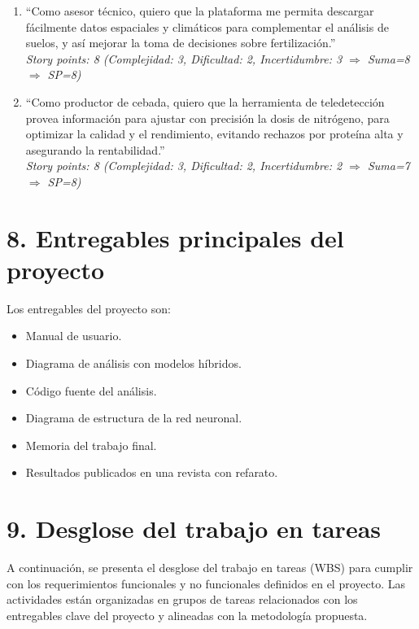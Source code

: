 \documentclass[
11pt, %
]{charter}
\begin{document}
\begin{enumerate}
    \item “Como asesor técnico, quiero que la plataforma me permita descargar fácilmente datos espaciales y climáticos para complementar el análisis de suelos, y así mejorar la toma de decisiones sobre fertilización.”\\ 
    \textit{Story points: 8 (Complejidad: 3, Dificultad: 2, Incertidumbre: 3 $\Rightarrow$ Suma=8 $\Rightarrow$ SP=8)}

    \item “Como productor de cebada, quiero que la herramienta de teledetección provea información para ajustar con precisión la dosis de nitrógeno, para optimizar la calidad y el rendimiento, evitando rechazos por proteína alta y asegurando la rentabilidad.”\\
    \textit{Story points: 8 (Complejidad: 3, Dificultad: 2, Incertidumbre: 2 $\Rightarrow$ Suma=7 $\Rightarrow$ SP=8)}
\end{enumerate}


\pagebreak

\section{8. Entregables principales del proyecto}
\label{sec:entregables}

Los entregables del proyecto son:

\begin{itemize}
	\item Manual de usuario.
	\item Diagrama de análisis con modelos híbridos.
	\item Código fuente del análisis.
	\item Diagrama de estructura de la red neuronal.
	\item Memoria del trabajo final.
	\item Resultados publicados en una revista con refarato.
\end{itemize}


\section{9. Desglose del trabajo en tareas}
\label{sec:wbs}

A continuación, se presenta el desglose del trabajo en tareas (WBS) para cumplir con los requerimientos funcionales y no funcionales definidos en el proyecto. Las actividades están organizadas en grupos de tareas relacionados con los entregables clave del proyecto y alineadas con la metodología propuesta.
\end{document}
